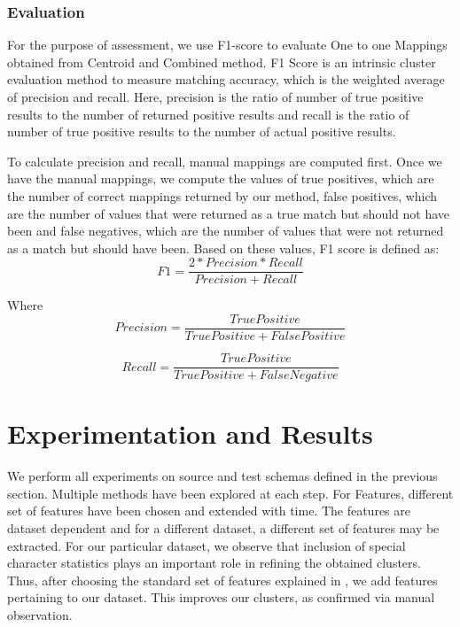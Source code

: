 \documentclass[conference]{IEEEtran}
\begin{document}
\subsubsection*{\textbf{Evaluation}}
For the purpose of assessment, we use F1-score to evaluate One to one Mappings obtained from Centroid and Combined method. F1 Score is an intrinsic cluster evaluation method to measure matching accuracy, which is the weighted average of precision and recall. Here, precision is the ratio of number of true positive results to the number of returned positive results and recall is the ratio of number of true positive results to the number of actual positive results.

To calculate precision and recall, manual mappings are computed first. Once we have the manual mappings, we compute the values of true positives, which are the number of correct mappings returned by our method, false positives, which are the number of values that were returned as a true match but should not have been and false negatives, which are the number of values that were not returned as a match but should have been. Based on these values, F1 score is defined as: 
\begin{equation}
F1 = \frac{2 * Precision * Recall}{Precision + Recall}
\end{equation}

\noindent
Where
\begin{equation}
Precision = \frac{True Positive}{True Positive + False Positive}
\end{equation}

\begin{equation}
Recall = \frac{True Positive}{True Positive + False Negative}
\end{equation}
    
\section{Experimentation and Results}
We perform all experiments on source and test schemas defined in the previous section. Multiple methods have been explored at each step. For Features, different set of features have been chosen and extended with time. The features are dataset dependent and for a different dataset, a different set of features may be extracted. For our particular dataset, we observe that inclusion of special character statistics plays an important role in refining the obtained clusters. Thus, after choosing the standard set of features explained in \cite{ref1}, we add features pertaining to our dataset. This improves our clusters, as confirmed via manual observation. 
\end{document}
